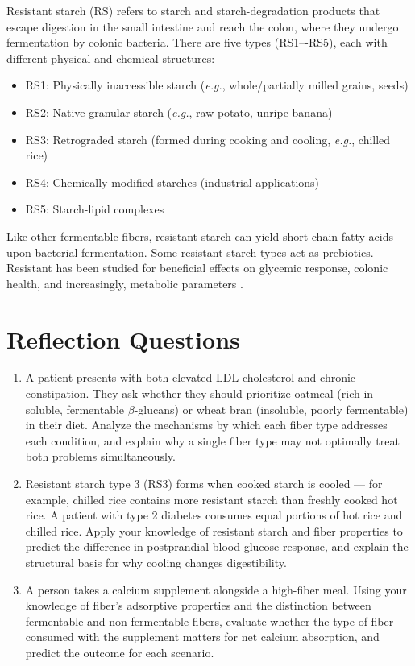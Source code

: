 \documentclass{tufte-handout}
\begin{document}
Resistant starch (RS) refers to starch and starch-degradation products that escape digestion in the small intestine and reach the colon, where they undergo fermentation by colonic bacteria\citep{sajilataResistantStarchAReview2006}. There are five types (RS1–-RS5), each with different physical and chemical structures:
\begin{itemize}
\item RS1: Physically inaccessible starch (\textit{e.g.}, whole/partially milled grains, seeds)
\item RS2: Native granular starch (\textit{e.g.}, raw potato, unripe banana)
\item RS3: Retrograded starch (formed during cooking and cooling, \textit{e.g.}, chilled rice)
\item RS4: Chemically modified starches (industrial applications)
\item RS5: Starch-lipid complexes
\end{itemize}
Like other fermentable fibers, resistant starch can yield short-chain fatty acids upon bacterial fermentation. Some resistant starch types act as prebiotics. Resistant has been studied for beneficial effects on glycemic response, colonic health, and increasingly, metabolic parameters \citep{birtResistantStarchPromise2013}.

\section{Reflection Questions}
\begin{enumerate}
\item A patient presents with both elevated LDL cholesterol and chronic constipation. They ask whether they should prioritize oatmeal (rich in soluble, fermentable $\beta$-glucans) or wheat bran (insoluble, poorly fermentable) in their diet. Analyze the mechanisms by which each fiber type addresses each condition, and explain why a single fiber type may not optimally treat both problems simultaneously.
\item Resistant starch type 3 (RS3) forms when cooked starch is cooled --- for example, chilled rice contains more resistant starch than freshly cooked hot rice. A patient with type 2 diabetes consumes equal portions of hot rice and chilled rice. Apply your knowledge of resistant starch and fiber properties to predict the difference in postprandial blood glucose response, and explain the structural basis for why cooling changes digestibility.
\item A person takes a calcium supplement alongside a high-fiber meal. Using your knowledge of fiber's adsorptive properties and the distinction between fermentable and non-fermentable fibers, evaluate whether the type of fiber consumed with the supplement matters for net calcium absorption, and predict the outcome for each scenario.
\end{enumerate}

\ifx\HCode\undefined
    
    
\fi
\end{document}
